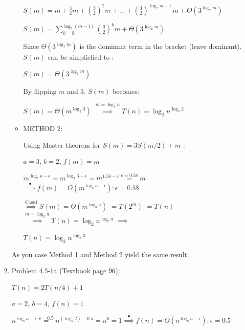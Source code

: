 \documentclass[11pt]{article}
\begin{document}
\begin{enumerate}
\begin{itemize}
	
		$S(m) = m+\frac{3}{2}m+{(\frac{3}{2})}^2m+...+{(\frac{3}{2})}^{\log_2{m-1}}m+\Theta(3^{\log_2{m}})$
		
		$S(m) = \sum_{k=0}^{\log_2{(m-1)}} {(\frac{3}{2})}^k m + \Theta(3^{\log_2{m}})  $
		
		Since $	\Theta(3^{\log_2{m}})  $ is the dominant term in the bracket (leave dominant), $S(m)$ can be simpliefied to :
		
		$S(m) = \Theta(3^{\log_2{m}}) $

		By flipping $m$ and $3$, $S(m)$ becomes:
		
		$S(m) = \Theta(m^{\log_2{3}}) $
		$\overset{m=\log_2{n}}{\implies}T(n)=\log_2{n}^{\log_3{2}}$	
	    
    \end{itemize}	
	

	\begin{itemize}
	    \item METHOD 2:
	    
	    Using Master theorem for $ S(m) = 3S(m/2) + m$ :
	    
    	$a=3$, $b=2$, $f(m)=m$
    	
    	$m^{\log_b{a}-\epsilon} \overset{}{=} m^{\log_{2}{3}-\epsilon}=m^{1.58-\epsilon}\overset{\epsilon=0.58}{=}m$  
	    $\overset{\mathrm{•}}{\implies} f(m)=O(m^{\log_b{a}-\epsilon}):\epsilon=0.58$
	    
	    $\overset{\mathrm{Case 1}}{\implies} S(m)=\Theta(m^{\log_b{a}})$	
	    $\overset{\mathrm{}}{=}T(2^m)$
	    $\overset{\mathrm{}}{=}T(n)$
	    $\overset{m=\log_2{n}}{\implies}T(n)=\log_2{n}^{\log_b{a}}$	
	    $\overset{}{\implies}$
	    
	    $T(n)=\log_2{n}^{\log_2{3}}$	
  		 

    \end{itemize}
    
    As you case Method 1 and Method 2 yield the same result.
	
	
	
	

	
	
	 
\pagebreak
	
\item Problem 4.5-1a (Textbook page 96):
	
	$T(n)=2T(n/4)+1$
	
	$a=2$, $b=4$, $f(n)=1$
	
	$n^{\log_b{a}-\epsilon} \overset{\epsilon=0.5}{=} n^{(\log_4{2})-0.5}=n^{0}=1
	\overset{\mathrm{•}}{\implies} f(n)=O(n^{\log_b{a}-\epsilon}):\epsilon=0.5$
	

\end{enumerate}
\end{document}
